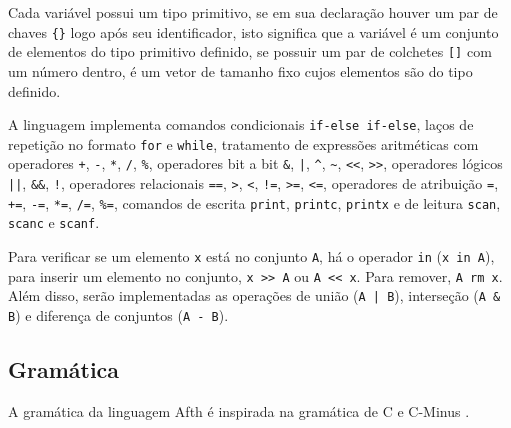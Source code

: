 \documentclass[
	article,			%
	11pt,				%
	oneside,			%
	a4paper,			%
	english,			%
	brazil,				%
	sumario=tradicional
	]{abntex2}
\begin{document}
Cada variável possui um tipo primitivo, se em sua declaração houver um par de chaves
\texttt{\{\}} logo após seu identificador, isto significa que a variável é um conjunto
de elementos do tipo primitivo definido, se possuir um par de colchetes \texttt{[]} 
com um número dentro, é um vetor de tamanho fixo cujos elementos são do tipo definido.

A linguagem implementa comandos condicionais \texttt{if-else if-else}, laços de repetição
no formato \texttt{for} e \texttt{while}, tratamento de expressões aritméticas com operadores
\texttt{+}, \texttt{-}, \texttt{*}, \texttt{/}, \texttt{\%}, operadores bit a bit \texttt{\&},
\texttt{|}, \texttt{\^}, \texttt{\~}, \texttt{<<}, \texttt{>>}, operadores lógicos \texttt{||},
\texttt{\&\&}, \texttt{!}, operadores relacionais \texttt{==}, \texttt{>}, \texttt{<}, \texttt{!=},
\texttt{>=}, \texttt{<=}, operadores de atribuição \texttt{=}, \texttt{+=}, \texttt{-=}, \texttt{*=},
\texttt{/=}, \texttt{\%=}, comandos de escrita \texttt{print}, \texttt{printc}, \texttt{printx} e
de leitura \texttt{scan}, \texttt{scanc} e \texttt{scanf}.

Para verificar se um elemento \texttt{x} está no conjunto \texttt{A}, há o operador \texttt{in}
(\texttt{x in A}), para inserir um elemento no conjunto, \texttt{x >> A} ou \texttt{A << x}. Para
remover, \texttt{A rm x}. Além disso, serão implementadas as operações de união
(\texttt{A | B}), interseção (\texttt{A \& B}) e diferença de conjuntos (\texttt{A - B}).

\subsection{Gramática}

A gramática da linguagem Afth é inspirada na gramática de C
\cite[Seção A13]{Kernighan:1988:CPL:576122} e C-Minus \cite{BNFCM}.


\setlength{\grammarparsep}{0pt plus 1pt minus 1pt} %
\setlength{\grammarindent}{12em} %
\end{document}
